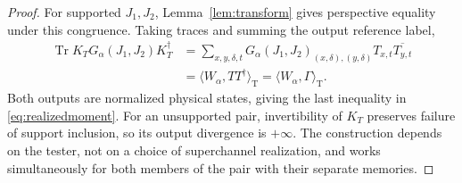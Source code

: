 \documentclass[11pt]{article}
\newcommand{\Tr}{\operatorname{Tr}}
\newcommand{\G}{G_\alpha}
\newcommand{\pair}[2]{\langle #1,#2\rangle_{\mathrm T}}
\theoremstyle{remark}
\begin{document}
\begin{proof}
For supported $J_1,J_2$, Lemma~\ref{lem:transform} gives perspective equality
under this congruence. Taking traces and summing the output reference label,
\begin{align*}
 \Tr K_T\G(J_1,J_2)K_T^\dagger
 &=\sum_{x,y,\delta,t}\G(J_1,J_2)_{(x,\delta),(y,\delta)}
                                  T_{x,t}\overline{T_{y,t}}\\
 &=\pair{W_\alpha}{TT^\dagger}=\pair{W_\alpha}{\Gamma}.
\end{align*}
Both outputs are normalized physical states, giving the last inequality in
\eqref{eq:realizedmoment}. For an unsupported pair, invertibility of $K_T$
preserves failure of support inclusion, so its output divergence is
$+\infty$. The construction depends on the tester, not on a choice of
superchannel realization, and works simultaneously for both members of
the pair with their separate memories.
\end{proof}
\end{document}
